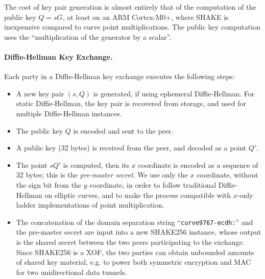 \documentclass{llncs}
\begin{document}
The cost of key pair generation is almost entirely that of the
computation of the public key $Q = sG$, at least on an ARM Cortex-M0+,
where SHAKE is inexpensive compared to curve point multiplications. The
public key computation uses the ``multiplication of the generator by
a scalar''.

\paragraph{Diffie-Hellman Key Exchange.}

Each party in a Diffie-Hellman key exchange executes the following steps:
\begin{itemize}

    \item A new key pair $(s, Q)$ is generated, if using ephemeral
    Diffie-Hellman. For static Diffie-Hellman, the key pair is recovered
    from storage, and used for multiple Diffie-Hellman instances.

    \item The public key $Q$ is encoded and sent to the peer.

    \item A public key (32 bytes) is received from the peer, and decoded
    as a point $Q'$.

    \item The point $sQ'$ is computed, then its $x$ coordinate is
    encoded as a sequence of 32 bytes; this is the \emph{pre-master
    secret}. We use only the $x$ coordinate, without the sign bit from
    the $y$ coordinate, in order to follow traditional Diffie-Hellman on
    elliptic curves\cite{X963}, and to make the process compatible with
    $x$-only ladder implementations of point multiplication.

    \item The concatenation of the domain separation string
    ``\verb+curve9767-ecdh:+'' and the pre-master secret are input into
    a new SHAKE256 instance, whose output is the shared secret between
    the two peers participating to the exchange. Since SHAKE256 is a
    XOF, the two parties can obtain unbounded amounts of shared key
    material, e.g. to power both symmetric encryption and MAC for two
    unidirectional data tunnels.

\end{itemize}
\end{document}
